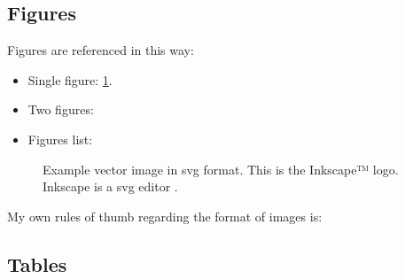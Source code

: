 \subsection{Figures}
Figures are referenced in this way:
\begin{itemize}
\item Single figure: \cref{fig:svg}.
\item Two figures:
\item Figures list:
\end{itemize}

\begin{figure}

\caption{\label{fig:svg} Example vector image in svg format. This is the
Inkscape™ logo. Inkscape is a \gls{svg} editor \cite{inkscape}.}
\end{figure}

My own rules of thumb regarding the format of images is:

\subsection{Tables}

